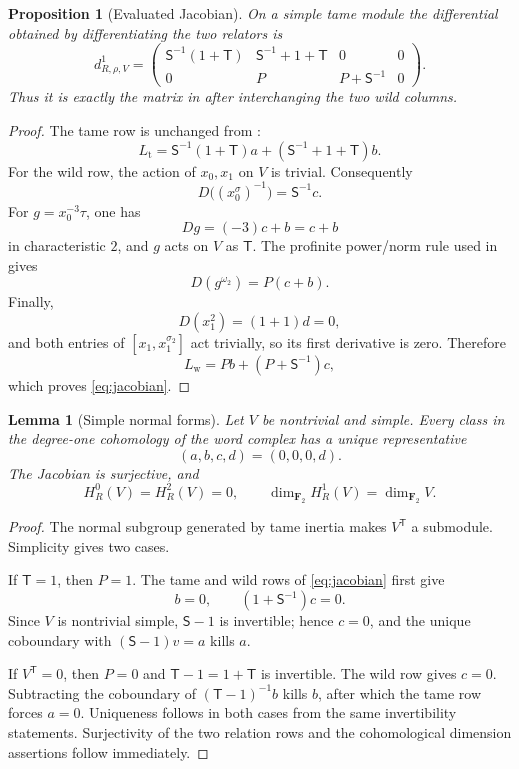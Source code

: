 \documentclass[11pt]{article}
\numberwithin{equation}{section}
\newtheorem{proposition}[theorem]{Proposition}
\newtheorem{lemma}[theorem]{Lemma}
\theoremstyle{definition}
\theoremstyle{remark}
\newcommand{\F}{\mathbf F}
\newcommand{\omegaTwo}{\omega_2}
\begin{document}
\begin{proposition}[Evaluated Jacobian]\label{prop:jacobian}
On a simple tame module the differential obtained by differentiating the
two relators is
\begin{equation}\label{eq:jacobian}
  d^1_{R,\rho,V}=
  \begin{pmatrix}
    \mathsf S^{-1}(1+\mathsf T)&
    \mathsf S^{-1}+1+\mathsf T&0&0\\
    0&P&P+\mathsf S^{-1}&0
  \end{pmatrix}.
\end{equation}
Thus it is exactly the matrix in \cite[(5.4)]{RT} after interchanging the
two wild columns.
\end{proposition}

\begin{proof}
The tame row is unchanged from \cite[(5.5)]{RT}:
\[
  L_{\mathrm t}
  =\mathsf S^{-1}(1+\mathsf T)a+
    (\mathsf S^{-1}+1+\mathsf T)b.
\]
For the wild row, the action of \(x_0,x_1\) on \(V\) is trivial.
Consequently
\[
  D\bigl((x_0^\sigma)^{-1}\bigr)=\mathsf S^{-1}c.
\]
For \(g=x_0^{-3}\tau\), one has
\[
  Dg=(-3)c+b=c+b
\]
in characteristic \(2\), and \(g\) acts on \(V\) as \(\mathsf T\).
The profinite power/norm rule used in \cite[Lemma~5.5]{RT} gives
\[
  D(g^{\omegaTwo})=P(c+b).
\]
Finally,
\[
  D(x_1^2)=(1+1)d=0,
\]
and both entries of \([x_1,x_1^{\sigma_2}]\) act trivially, so its first
derivative is zero.  Therefore
\[
  L_{\mathrm w}=Pb+(P+\mathsf S^{-1})c,
\]
which proves \cref{eq:jacobian}.
\end{proof}

\begin{lemma}[Simple normal forms]\label{lem:normalforms}
Let \(V\) be nontrivial and simple.  Every class in the degree-one
cohomology of the word complex has a unique representative
\[
  (a,b,c,d)=(0,0,0,d).
\]
The Jacobian is surjective, and
\[
  H^0_R(V)=H^2_R(V)=0,\qquad
  \dim_{\F_2}H^1_R(V)=\dim_{\F_2}V.
\]
\end{lemma}

\begin{proof}
The normal subgroup generated by tame inertia makes
\(V^{\mathsf T}\) a submodule.  Simplicity gives two cases.

If \(\mathsf T=1\), then \(P=1\).  The tame and wild rows of
\cref{eq:jacobian} first give
\[
  b=0,\qquad (1+\mathsf S^{-1})c=0.
\]
Since \(V\) is nontrivial simple, \(\mathsf S-1\) is invertible; hence
\(c=0\), and the unique coboundary with
\((\mathsf S-1)v=a\) kills \(a\).

If \(V^{\mathsf T}=0\), then \(P=0\) and
\(\mathsf T-1=1+\mathsf T\) is invertible.  The wild row gives \(c=0\).
Subtracting the coboundary of
\((\mathsf T-1)^{-1}b\) kills \(b\), after which the tame row forces
\(a=0\).  Uniqueness follows in both cases from the same invertibility
statements.  Surjectivity of the two relation rows and the cohomological
dimension assertions follow immediately.
\end{proof}
\end{document}

